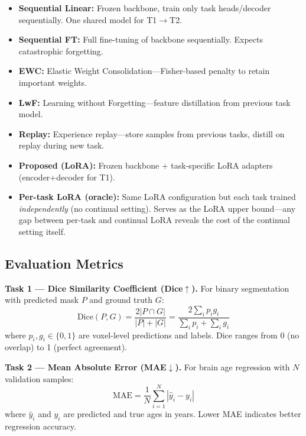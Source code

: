 \documentclass[journal,twoside,web]{ieeecolor}
\begin{document}
\begin{itemize}
\item \textbf{Sequential Linear:} Frozen backbone, train only task heads/decoder sequentially. One shared model for T1$\to$T2.
\item \textbf{Sequential FT:} Full fine-tuning of backbone sequentially. Expects catastrophic forgetting.
\item \textbf{EWC:} Elastic Weight Consolidation---Fisher-based penalty to retain important weights.
\item \textbf{LwF:} Learning without Forgetting---feature distillation from previous task model.
\item \textbf{Replay:} Experience replay---store samples from previous tasks, distill on replay during new task.
\item \textbf{Proposed (LoRA):} Frozen backbone + task-specific LoRA adapters (encoder+decoder for T1).
\item \textbf{Per-task LoRA (oracle):} Same LoRA configuration but each task trained \emph{independently} (no continual setting). Serves as the LoRA upper bound---any gap between per-task and continual LoRA reveals the cost of the continual setting itself.
\end{itemize}

\subsection{Evaluation Metrics}
\label{sec:metrics}

\textbf{Task 1 --- Dice Similarity Coefficient (Dice$\uparrow$).} For binary segmentation with predicted mask $P$ and ground truth $G$:
\begin{equation}
\text{Dice}(P, G) = \frac{2 |P \cap G|}{|P| + |G|} = \frac{2 \sum_i p_i g_i}{\sum_i p_i + \sum_i g_i}
\label{eq:dice}
\end{equation}
where $p_i, g_i \in \{0,1\}$ are voxel-level predictions and labels. Dice ranges from 0 (no overlap) to 1 (perfect agreement).

\textbf{Task 2 --- Mean Absolute Error (MAE$\downarrow$).} For brain age regression with $N$ validation samples:
\begin{equation}
\text{MAE} = \frac{1}{N} \sum_{i=1}^{N} |\hat{y}_i - y_i|
\label{eq:mae}
\end{equation}
where $\hat{y}_i$ and $y_i$ are predicted and true ages in years. Lower MAE indicates better regression accuracy.
\end{document}
